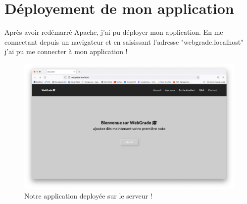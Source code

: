 \documentclass[12pt, a4paper]{article}
\begin{document}
\section{Déployement de mon application}
Après avoir redémarré Apache, j’ai pu déployer mon application.
En me connectant depuis un navigateur et en saisissant l'adresse 
"webgrade.localhost" j'ai pu me connecter à mon application !
\begin{figure}[h]
    \centering
    \includegraphics[width=1\textwidth]{webgrade.png}
    \caption{Notre application deployée sur le serveur !}
    \label{fig:dep}
\end{figure}
\end{document}
